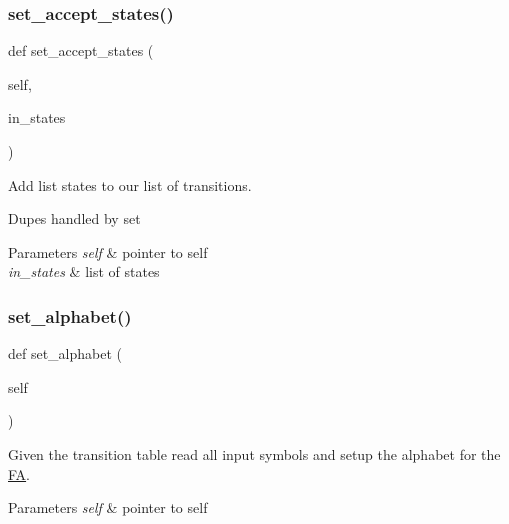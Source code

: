 \subsubsection{\texorpdfstring{set\+\_\+accept\+\_\+states()}{set\_accept\_states()}}
{\footnotesize\ttfamily def set\+\_\+accept\+\_\+states (\begin{DoxyParamCaption}\item[{}]{self,  }\item[{}]{in\+\_\+states }\end{DoxyParamCaption})}



Add list states to our list of transitions. 

Dupes handled by set 
\begin{DoxyParams}{Parameters}
{\em self} & pointer to self \\
\hline
{\em in\+\_\+states} & list of states \\
\hline
\end{DoxyParams}
\mbox{\label{classfinite__automaton_1_1_f_a_a99364809624a50f61fb859dd8c87813a}} 
\subsubsection{\texorpdfstring{set\+\_\+alphabet()}{set\_alphabet()}}
{\footnotesize\ttfamily def set\+\_\+alphabet (\begin{DoxyParamCaption}\item[{}]{self }\end{DoxyParamCaption})}



Given the transition table read all input symbols and setup the alphabet for the \mbox{\hyperlink{classfinite__automaton_1_1_f_a}{FA}}. 


\begin{DoxyParams}{Parameters}
{\em self} & pointer to self \\
\hline
\end{DoxyParams}
\mbox{\label{classfinite__automaton_1_1_f_a_aaa9f224b31953da5ada0db6c434f05db}} 
